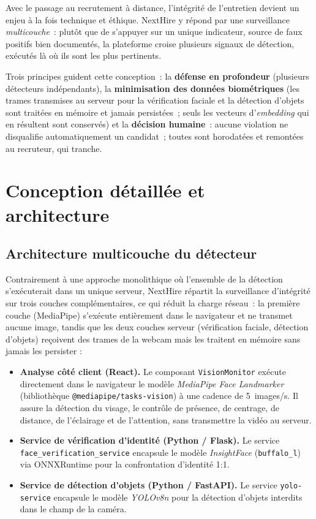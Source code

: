 Avec le passage au recrutement à distance, l'intégrité de l'entretien devient un enjeu à la fois technique et éthique. NextHire y répond par une surveillance \textit{multicouche}~: plutôt que de s'appuyer sur un unique indicateur, source de faux positifs bien documentés, la plateforme croise plusieurs signaux de détection, exécutés là où ils sont les plus pertinents.

Trois principes guident cette conception~: la \textbf{défense en profondeur} (plusieurs détecteurs indépendants), la \textbf{minimisation des données biométriques} (les trames transmises au serveur pour la vérification faciale et la détection d'objets sont traitées en mémoire et jamais persistées~; seuls les vecteurs d'\textit{embedding} qui en résultent sont conservés) et la \textbf{décision humaine}~: aucune violation ne disqualifie automatiquement un candidat~; toutes sont horodatées et remontées au recruteur, qui tranche.

\section{Conception détaillée et architecture}

\subsection{Architecture multicouche du détecteur}

Contrairement à une approche monolithique où l'ensemble de la détection s'exécuterait dans
un unique serveur, NextHire répartit la surveillance d'intégrité sur trois couches
complémentaires, ce qui réduit la charge réseau~: la première couche (MediaPipe) s'exécute
entièrement dans le navigateur et ne transmet aucune image, tandis que les deux couches
serveur (vérification faciale, détection d'objets) reçoivent des trames de la webcam mais
les traitent en mémoire sans jamais les persister :

\begin{itemize}
  \item \textbf{Analyse côté client (React).} Le composant \texttt{VisionMonitor} exécute
        directement dans le navigateur le modèle \textit{MediaPipe Face Landmarker}
        (bibliothèque \texttt{@mediapipe/\allowbreak tasks-vision}) à une cadence de 5~images/s. Il assure
        la détection du visage, le contrôle de présence, de centrage, de distance, de
        l'éclairage et de l'attention, sans transmettre la vidéo au serveur.
  \item \textbf{Service de vérification d'identité (Python / Flask).} Le service
        \texttt{face\_\allowbreak verification\_\allowbreak service} encapsule le modèle \textit{InsightFace}
        (\texttt{buffalo\_l}) via ONNXRuntime pour la confrontation d'identité 1:1.
  \item \textbf{Service de détection d'objets (Python / FastAPI).} Le service
        \texttt{yolo-service} encapsule le modèle \textit{YOLOv8n} pour la détection d'objets
        interdits dans le champ de la caméra.
\end{itemize}

